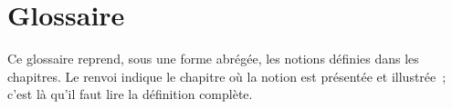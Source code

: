 
\chapter{Glossaire}
\label{ann:glossaire}

Ce glossaire reprend, sous une forme abrégée, les notions définies dans les
chapitres. Le renvoi indique le chapitre où la notion est présentée et
illustrée~; c'est là qu'il faut lire la définition complète.

